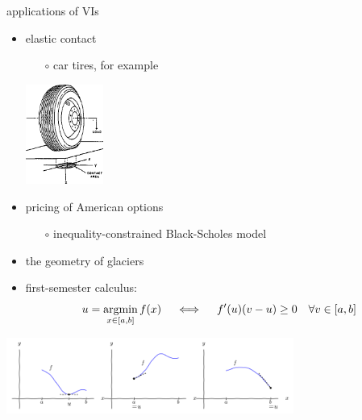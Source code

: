 \documentclass[svgnames,
               hyperref={colorlinks,citecolor=DeepPink4,linkcolor=FireBrick,urlcolor=Maroon},
               usepdftitle=false]  %
               {beamer}
\begin{document}
\begin{frame}{applications of VIs}

\begin{itemize}
\item elastic contact
    \begin{itemize}
    \item[$\circ$] car tires, for example
    \end{itemize}

\vspace{-10mm}
\hfill \includegraphics[width=0.2\textwidth]{../talk-dms/figs/tirecontact.png}

\vspace{-20mm}
\item pricing of American options
    \begin{itemize}
    \item[$\circ$] inequality-constrained Black-Scholes model
    \end{itemize}

\vspace{1.5mm}
\item the geometry of glaciers %

\vspace{1.5mm}
\item first-semester calculus:
    $$u = \mathop{\textnormal{argmin}}_{x\in[a,b]} f(x) \quad \iff \quad f'(u)(v-u) \ge 0 \quad \forall v \in[a,b]$$
\end{itemize}

\vspace{-5mm}
\begin{center}
\includegraphics[height=25mm]{../talk-oxford/images/calcone.png}
\end{center}
\end{frame}


\end{document}
